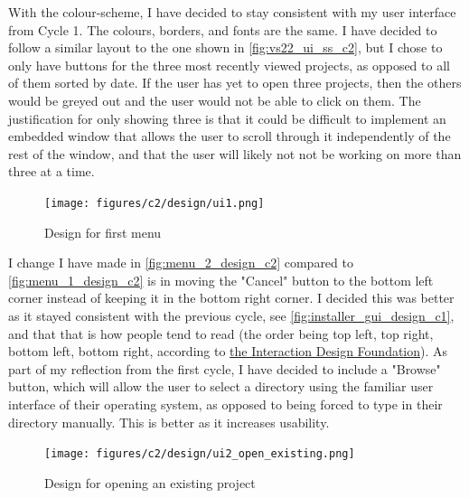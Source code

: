 \documentclass[11pt]{article}
\begin{document}
                With the colour-scheme, I have decided to stay consistent with my user interface from Cycle 1. The colours, borders, and fonts are the same. 
                I have decided to follow a similar layout to the one shown in \autoref{fig:vs22_ui_ss_c2}, but I chose to only have buttons for the three most recently viewed projects, as opposed to all of them sorted by date. 
                If the user has yet to open three projects, then the others would be greyed out and the user would not be able to click on them. 
                The justification for only showing three is that it could be difficult to implement an embedded window that allows the user to scroll through it independently of the rest of the window, and that the user will likely not not be working on more than three at a time. 

                \begin{figure}[!ht]
                    \centering
                    \texttt{[image: figures/c2/design/ui1.png]}
                    \caption{Design for first menu}
                    \label{fig:menu_1_design_c2}
                \end{figure}

                \pagebreak
                I change I have made in \autoref{fig:menu_2_design_c2} compared to \autoref{fig:menu_1_design_c2} is in moving the "Cancel" button to the bottom left corner instead of keeping it in the bottom right corner. I decided this was better as it stayed consistent with the previous cycle, see \autoref{fig:installer_gui_design_c1}, and that that is how people tend to read (the order being top left, top right, bottom left, bottom right, according to \href{https://www.interaction-design.org/literature/article/visual-hierarchy-organizing-content-to-follow-natural-eye-movement-patterns}{the Interaction Design Foundation}). As part of my reflection from the first cycle, I have decided to include a "Browse" button, which will allow the user to select a directory using the familiar user interface of their operating system, as opposed to being forced to type in their directory manually. This is better as it increases usability. 

                \begin{figure}[!ht]
                    \centering
                    \texttt{[image: figures/c2/design/ui2\_open\_existing.png]}
                    \caption{Design for opening an existing project}
                    \label{fig:menu_2_design_c2}
                \end{figure}
\end{document}

